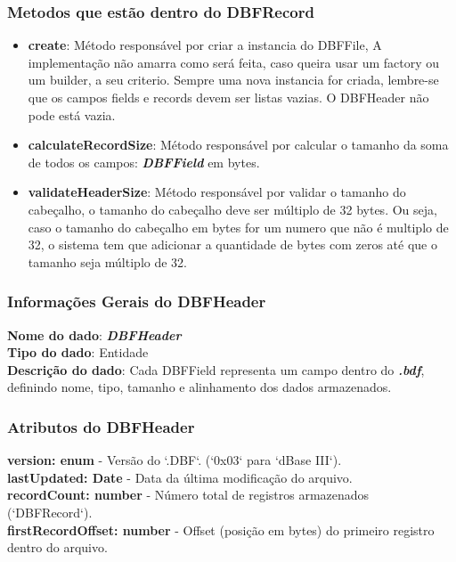 \subsubsection{Metodos que estão dentro do DBFRecord}
\begin{itemize}
    \item \textbf{create}: Método responsável por criar a instancia do DBFFile, A implementação não amarra como será feita, caso queira usar um factory ou um builder, a seu criterio. Sempre uma nova instancia for criada, lembre-se que os campos fields e records devem ser listas vazias. O DBFHeader não pode está vazia.
    \item \textbf{calculateRecordSize}: Método responsável por calcular o tamanho da soma de todos os campos: \textit{\textbf{DBFField}} em bytes.
    \item \textbf{validateHeaderSize}: Método responsável por validar o tamanho do cabeçalho, o tamanho do cabeçalho deve ser múltiplo de 32 bytes. Ou seja, caso o tamanho do cabeçalho em bytes for um numero que não é multiplo de 32, o sistema tem que adicionar a quantidade de bytes com zeros até que o tamanho seja múltiplo de 32.
\end{itemize}


\subsubsection{Informações Gerais do DBFHeader}
\textbf{Nome do dado}: \textit{\textbf{DBFHeader}} \\  
\textbf{Tipo do dado}: Entidade \\  
\textbf{Descrição do dado}: Cada DBFField representa um campo dentro do \textit{\textbf{.bdf}}, definindo nome, tipo, tamanho e alinhamento dos dados armazenados. \\  

\subsubsection{Atributos do DBFHeader}  
\textbf{version: enum} - Versão do `.DBF`. (`0x03` para `dBase III`). \\  
\textbf{lastUpdated: Date} - Data da última modificação do arquivo. \\  
\textbf{recordCount: number} - Número total de registros armazenados (`DBFRecord`). \\  
\textbf{firstRecordOffset: number} - Offset (posição em bytes) do primeiro registro dentro do arquivo. \\  

